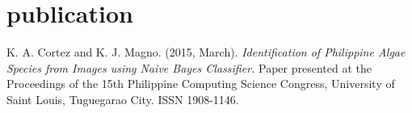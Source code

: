 \documentclass[print]{cv-style}          %
\begin{document}

\section{publication}
  \vspace{-0.2cm}

    K. A. Cortez and K. J. Magno. (2015, March). \textit{Identification of Philippine Algae Species from Images using Naive Bayes Classifier.} Paper presented at the Proceedings of the 15th Philippine Computing Science Congress, University of Saint Louis, Tuguegarao City. ISSN 1908-1146.




\end{document}
